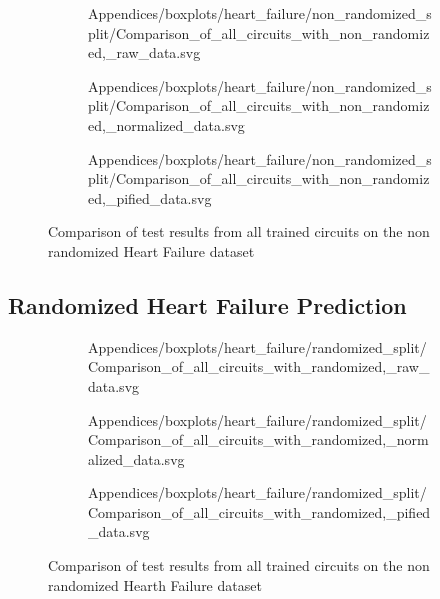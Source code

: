 \begin{figure}[!h]
    \begin{subfigure}{.5\textwidth}
        \centering
        
        {Appendices/boxplots/heart_failure/non_randomized_split/Comparison_of_all_circuits_with_non_randomized,_raw_data.svg}
    \end{subfigure}
    \begin{subfigure}{.5\textwidth}
        \centering
        
        {Appendices/boxplots/heart_failure/non_randomized_split/Comparison_of_all_circuits_with_non_randomized,_normalized_data.svg}
    \end{subfigure}
    \begin{subfigure}{.5\textwidth}
        \centering
        
        {Appendices/boxplots/heart_failure/non_randomized_split/Comparison_of_all_circuits_with_non_randomized,_pified_data.svg}
    \end{subfigure}
    \caption{Comparison of test results from all trained circuits on the non randomized Heart Failure dataset}
    \label{fig:circuits_results_non_r_hf}
\end{figure}

\clearpage 
\subsection{Randomized Heart Failure Prediction}
\label{chapter:heart_failure_prediction_randomized}

\begin{figure}[!h]
    \begin{subfigure}{.5\textwidth}
        \centering
        
        {Appendices/boxplots/heart_failure/randomized_split/Comparison_of_all_circuits_with_randomized,_raw_data.svg}
    \end{subfigure}
    \begin{subfigure}{.5\textwidth}
        \centering
        
        {Appendices/boxplots/heart_failure/randomized_split/Comparison_of_all_circuits_with_randomized,_normalized_data.svg}
    \end{subfigure}
    \begin{subfigure}{.5\textwidth}
        \centering
        
        {Appendices/boxplots/heart_failure/randomized_split/Comparison_of_all_circuits_with_randomized,_pified_data.svg}
    \end{subfigure}
    \caption{Comparison of test results from all trained circuits on the non randomized Hearth Failure dataset}
    \label{fig:circuits_results_r_hf}
\end{figure}

